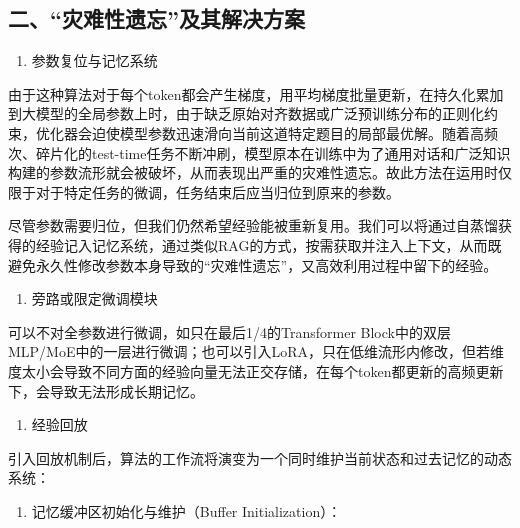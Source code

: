 \hypertarget{ux4e8cux707eux96beux6027ux9057ux5fd8ux53caux5176ux89e3ux51b3ux65b9ux6848}{%
\subsection{二、``灾难性遗忘''及其解决方案}\label{ux4e8cux707eux96beux6027ux9057ux5fd8ux53caux5176ux89e3ux51b3ux65b9ux6848}}

\begin{enumerate}
\def\labelenumi{\arabic{enumi}.}
\tightlist
\item
  参数复位与记忆系统
\end{enumerate}

由于这种算法对于每个token都会产生梯度，用平均梯度批量更新，在持久化累加到大模型的全局参数上时，由于缺乏原始对齐数据或广泛预训练分布的正则化约束，优化器会迫使模型参数迅速滑向当前这道特定题目的局部最优解。随着高频次、碎片化的test-time任务不断冲刷，模型原本在训练中为了通用对话和广泛知识构建的参数流形就会被破坏，从而表现出严重的灾难性遗忘。故此方法在运用时仅限于对于特定任务的微调，任务结束后应当归位到原来的参数。

尽管参数需要归位，但我们仍然希望经验能被重新复用。我们可以将通过自蒸馏获得的经验记入记忆系统，通过类似RAG的方式，按需获取并注入上下文，从而既避免永久性修改参数本身导致的``灾难性遗忘''，又高效利用过程中留下的经验。

\begin{enumerate}
\def\labelenumi{\arabic{enumi}.}
\setcounter{enumi}{1}
\tightlist
\item
  旁路或限定微调模块
\end{enumerate}

可以不对全参数进行微调，如只在最后1/4的Transformer Block中的双层MLP/MoE中的一层进行微调；也可以引入LoRA，只在低维流形内修改，但若维度太小会导致不同方面的经验向量无法正交存储，在每个token都更新的高频更新下，会导致无法形成长期记忆。

\begin{enumerate}
\def\labelenumi{\arabic{enumi}.}
\setcounter{enumi}{2}
\tightlist
\item
  经验回放
\end{enumerate}

引入回放机制后，算法的工作流将演变为一个同时维护当前状态和过去记忆的动态系统：

\begin{enumerate}
\def\labelenumi{\arabic{enumi}.}
\tightlist
\item
  记忆缓冲区初始化与维护（Buffer Initialization）：
\end{enumerate}


